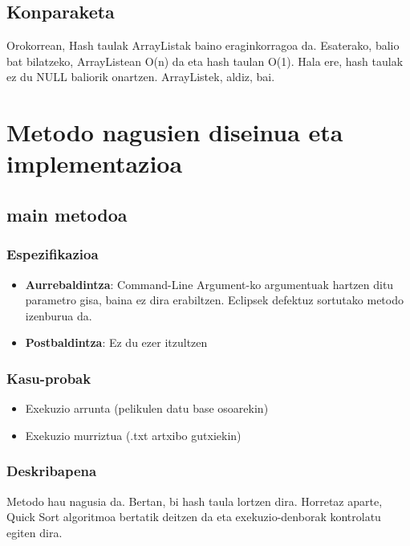 \documentclass[a4paper,10pt]{report}
\begin{document}
\section{Konparaketa}
	Orokorrean, Hash taulak ArrayListak baino eraginkorragoa da. Esaterako, balio bat bilatzeko, ArrayListean O(n) da eta hash taulan O(1). Hala ere, hash taulak ez du NULL baliorik onartzen. ArrayListek, aldiz, bai.

\chapter{Metodo nagusien diseinua eta implementazioa}
\section{main metodoa}
	\subsection*{Espezifikazioa}
		\begin{itemize}
			\item \textbf{Aurrebaldintza}: Command-Line Argument-ko argumentuak hartzen ditu parametro gisa, baina ez dira erabiltzen. Eclipsek defektuz sortutako metodo izenburua da.
			\item \textbf{Postbaldintza}: Ez du ezer itzultzen
		\end{itemize}
	\subsection*{Kasu-probak}
		\begin{itemize}
			\item Exekuzio arrunta (pelikulen datu base osoarekin)
			\item Exekuzio murriztua (.txt artxibo gutxiekin)
		\end{itemize}
	\subsection*{Deskribapena}
		Metodo hau nagusia da. Bertan, bi hash taula lortzen dira. Horretaz aparte, Quick Sort algoritmoa bertatik deitzen da eta exekuzio-denborak kontrolatu egiten dira.
\end{document}
